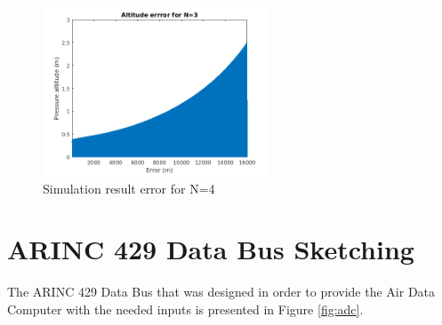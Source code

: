\documentclass[english,palatino]{ist-report}
\begin{document}
\begin{figure}
	\centering
	\includegraphics[width=0.6\textwidth]{graphics/N4.png}
	\caption{Simulation result error for N=4}
	\label{fig:N4}
\end{figure}


\section{ARINC 429 Data Bus Sketching}
The ARINC 429 Data Bus that was designed in order to provide the Air Data Computer with the needed inputs is presented in Figure \ref{fig:adc}.
\end{document}
